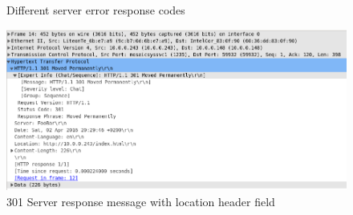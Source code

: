 \documentclass[10pt,twocolumn]{witseiepaper}
\begin{document}
		\begin{figure}[h!]
			\centering
			 \\
			 \\
			 \\
			 \\
			\caption{Different server error response codes}
			\label{fig:server_error}
		\end{figure}
		
		\begin{figure}[h!]
			\centering
			\includegraphics[width=\columnwidth]{resources/301_response_message}
			\caption{301 Server response message with location header field}
			\label{fig:301}
		\end{figure}




\end{document}
